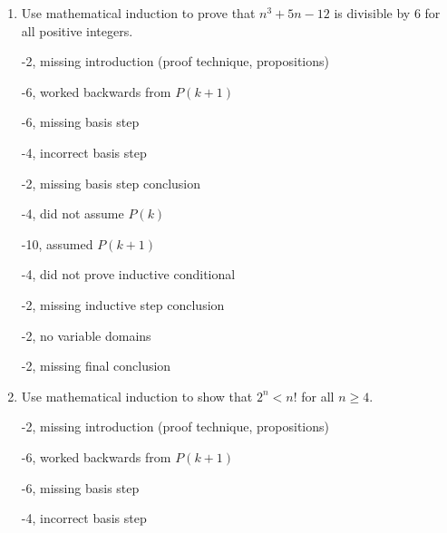 \begin{enumerate}

















    
\item Use mathematical induction to prove that $n^3 +5n -12$ is divisible by $6$ for all positive integers. 

\begin{rubric}
-2, missing introduction (proof technique, propositions)

-6, worked backwards from $P(k+1)$

-6, missing basis step

-4, incorrect basis step

-2, missing basis step conclusion

-4, did not assume $P(k)$

-10, assumed $P(k+1)$

-4, did not prove inductive conditional

-2, missing inductive step conclusion

-2, no variable domains

-2, missing final conclusion
\end{rubric}

\item Use mathematical induction to show that $2^n < n!$ for all $n \geq 4$. 

\begin{rubric}
-2, missing introduction (proof technique, propositions)

-6, worked backwards from $P(k+1)$

-6, missing basis step

-4, incorrect basis step


\end{rubric}
\end{enumerate}
